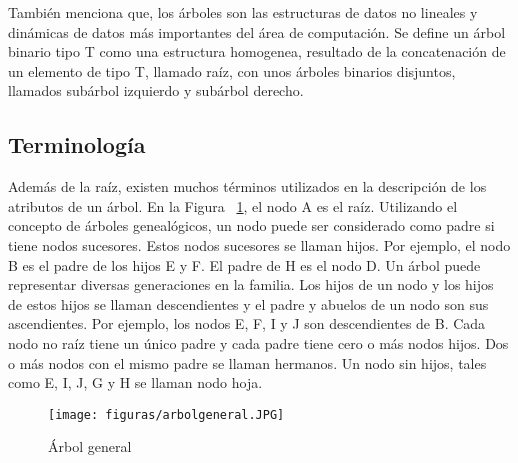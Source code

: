 \documentclass[10pt,conference]{IEEEtran}
\begin{document}
\par También \citep{cairo} menciona que, los árboles son las estructuras de datos no lineales y dinámicas de datos más importantes del área de computación. Se define un árbol binario tipo T como una estructura homogenea, resultado de la concatenación de un elemento de tipo T, llamado raíz, con unos árboles binarios disjuntos, llamados subárbol izquierdo y subárbol derecho.
\subsection{\textbf{Terminología}}
Además de la raíz, existen muchos términos utilizados en la descripción de los atributos de un árbol. En la Figura ~\ref{farb}, el nodo A es el raíz. Utilizando el concepto de árboles genealógicos, un nodo puede ser considerado como padre si tiene nodos sucesores.
Estos nodos sucesores se llaman hijos. Por ejemplo, el nodo B es el padre de los hijos E y F. El padre de H es el nodo D. Un árbol puede representar diversas generaciones en la familia.
Los hijos de un nodo y los hijos de estos hijos se llaman descendientes y el padre y abuelos de un nodo son sus ascendientes. Por ejemplo, los nodos E, F, I y J son descendientes de B. Cada nodo no raíz tiene un único padre y cada padre tiene cero o más nodos hijos. Dos o más nodos con el mismo padre se llaman hermanos. Un nodo sin hijos, tales como E, I, J, G y H se llaman nodo hoja.
\begin{figure}[H]
    \begin{center}
       \texttt{[image: figuras/arbolgeneral.JPG]}
      \caption{Árbol general}
      \label{farb} 
      \end{center}
\end{figure}
    
\end{document}

